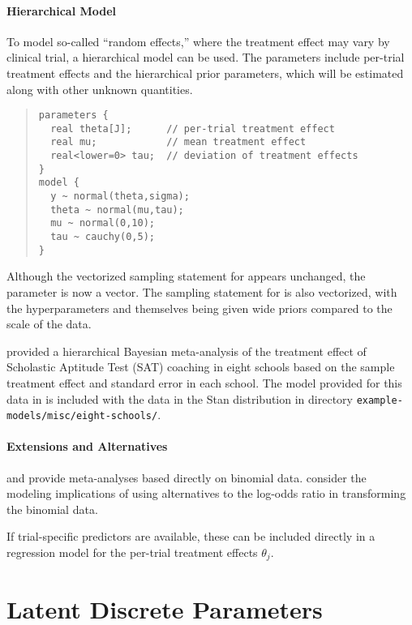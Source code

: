 \subsubsection{Hierarchical Model}

To model so-called ``random effects,'' where the treatment effect may
vary by clinical trial, a hierarchical model can be used.  The
parameters include per-trial treatment effects and the hierarchical
prior parameters, which will be estimated along with other unknown
quantities.  
%
\begin{quote}
\begin{Verbatim}[fontsize=\small]
parameters {
  real theta[J];      // per-trial treatment effect
  real mu;            // mean treatment effect
  real<lower=0> tau;  // deviation of treatment effects
}
model {
  y ~ normal(theta,sigma);
  theta ~ normal(mu,tau);
  mu ~ normal(0,10);
  tau ~ cauchy(0,5);
}
\end{Verbatim}
\end{quote}
%
Although the vectorized sampling statement for  appears
unchanged, the parameter  is now a vector.  The sampling
statement for  is also vectorized, with the
hyperparameters  and  themselves being given wide
priors compared to the scale of the data.

\citet{Rubin:1981} provided a hierarchical Bayesian meta-analysis of
the treatment effect of Scholastic Aptitude Test (SAT) coaching in
eight schools based on the sample treatment effect and standard error
in each school.  The model provided for this data in
\citep[Section~5.5]{GelmanEtAl:2013} is included with the
data in the Stan distribution in directory
\nolinkurl{example-models/misc/eight-schools/}.

\subsubsection{Extensions and Alternatives}

\citet{SmithSpiegelhalterThomas:1995} and
\citet[Section~19.4]{GelmanEtAl:2013} provide
meta-analyses based directly on binomial data.
\citet{WarnThompsonSpiegelhalter:2002} consider the modeling
implications of using alternatives to the log-odds ratio in
transforming the binomial data.

If trial-specific predictors are available, these can be included
directly in a regression model for the per-trial treatment effects
$\theta_j$.


\chapter{Latent Discrete Parameters}\label{latent-discrete.chapter}

